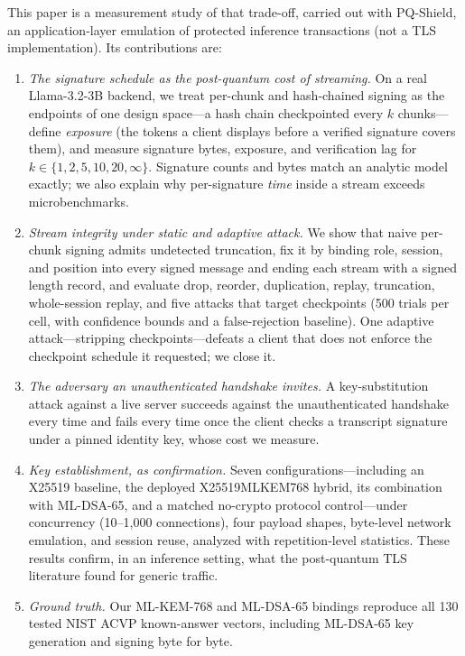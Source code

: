 \documentclass[conference]{IEEEtran}
\begin{document}
This paper is a measurement study of that trade-off, carried out with PQ-Shield, an application-layer
emulation of protected inference transactions (not a TLS implementation). Its contributions are:
\begin{enumerate}
  \item \emph{The signature schedule as the post-quantum cost of streaming.} On a real
  Llama-3.2-3B backend, we treat per-chunk and hash-chained signing as the endpoints of one design
  space---a hash chain checkpointed every $k$ chunks---define \emph{exposure} (the tokens a client
  displays before a verified signature covers them), and measure signature bytes, exposure, and
  verification lag for $k\in\{1,2,5,10,20,\infty\}$. Signature counts and bytes match an analytic model
  exactly; we also explain why per-signature \emph{time} inside a stream exceeds microbenchmarks.
  \item \emph{Stream integrity under static and adaptive attack.} We show that naive per-chunk signing
  admits undetected truncation, fix it by binding role, session, and position into every signed
  message and ending each stream with a signed length record, and evaluate drop, reorder,
  duplication, replay, truncation, whole-session replay, and five attacks that target checkpoints
  (500 trials per cell, with confidence bounds and a false-rejection baseline). One adaptive
  attack---stripping checkpoints---defeats a client that does not enforce the checkpoint schedule it
  requested; we close it.
  \item \emph{The adversary an unauthenticated handshake invites.} A key-substitution attack against a
  live server succeeds against the unauthenticated handshake every time and fails every time once the
  client checks a transcript signature under a pinned identity key, whose cost we measure.
  \item \emph{Key establishment, as confirmation.} Seven configurations---including an X25519 baseline,
  the deployed X25519MLKEM768 hybrid, its combination with ML-DSA-65, and a matched no-crypto protocol
  control---under concurrency (10--1,000 connections), four payload shapes, byte-level network
  emulation, and session reuse, analyzed with repetition-level statistics. These results confirm, in an
  inference setting, what the post-quantum TLS literature found for generic traffic.
  \item \emph{Ground truth.} Our ML-KEM-768 and ML-DSA-65 bindings reproduce all 130 tested NIST ACVP
  known-answer vectors, including ML-DSA-65 key generation and signing byte for byte.
\end{enumerate}
\end{document}
